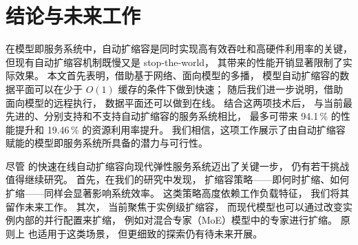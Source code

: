 \section{结论与未来工作}
\label{sec:concl}

\noindent
在模型即服务系统中，自动扩缩容是同时实现高有效吞吐和高硬件利用率的关键，
但现有自动扩缩容机制既慢又是 stop-the-world，
其带来的性能开销显著限制了实际效果。
本文首先表明，借助基于网络、面向模型的多播，
模型自动扩缩容的数据平面可以在少于 $O(1)$ 缓存的条件下做到快速；
随后我们进一步说明，借助面向模型的远程执行，
数据平面还可以做到在线。
结合这两项技术后，
与当前最先进的、分别支持和不支持自动扩缩容的服务系统相比，
{\sys} 最多可带来 94.1\,\% 的性能提升和 19.46\,\% 的资源利用率提升。
我们相信，这项工作展示了由自动扩缩容赋能的模型即服务系统所具备的潜力与可行性。

尽管 {\sys} 的快速在线自动扩缩容向现代弹性服务系统迈出了关键一步，
仍有若干挑战值得继续研究。
首先，在我们的研究中发现，
扩缩容策略——即何时扩缩、如何扩缩——同样会显著影响系统效率。
这类策略高度依赖工作负载特征，
我们将其留作未来工作。
其次，{\sys} 当前聚焦于实例级扩缩容，
而现代模型也可以通过改变实例内部的并行配置来扩缩，
例如对混合专家（MoE）模型中的专家进行扩缩。
原则上 {\sys} 也适用于这类场景，
但更细致的探索仍有待未来开展。
